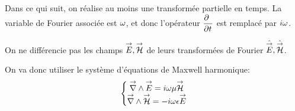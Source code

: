 Dans ce qui suit, on réalise au moins une transformée partielle en temps. La variable de Fourier associée est $\w$, et donc l'opérateur $\ddr{t}{~}$ est remplacé par $i\w$.

\begin{tcolorbox}
On ne différencie pas les champs $\vE,\vH$ de leurs transformées de Fourier $\hat \vE, \hat \vH$.
\end{tcolorbox}

On va donc utiliser le système d'équations de Maxwell harmonique:
\begin{equation}
    \left\lbrace 
    \begin{matrix}
    \vrot \vE = i \omega \mu \vH \\
    \vrot \vH = -i \omega \eps \vE
    \end{matrix}
    \right.
    \label{eq:imp_fourier:intro:maxwell_harmonique}
\end{equation}

